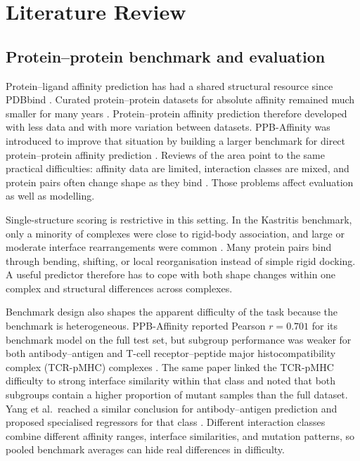 \chapter{Literature Review}
\label{ch:litreview}

\section{Protein--protein benchmark and evaluation}

Protein--ligand affinity prediction has had a shared structural resource since PDBbind \citep{Wang2004PDBbind}. Curated protein--protein datasets for absolute affinity remained much smaller for many years \citep{Kastritis2011Benchmark}. Protein--protein affinity prediction therefore developed with less data and with more variation between datasets. PPB-Affinity was introduced to improve that situation by building a larger benchmark for direct protein--protein affinity prediction \citep{Liu2024PPBAffinity}. Reviews of the area point to the same practical difficulties: affinity data are limited, interaction classes are mixed, and protein pairs often change shape as they bind \citep{Siebenmorgen2020PPIReview,Guo2022PPBAReview}. Those problems affect evaluation as well as modelling.

Single-structure scoring is restrictive in this setting. In the Kastritis benchmark, only a minority of complexes were close to rigid-body association, and large or moderate interface rearrangements were common \citep{Kastritis2011Benchmark}. Many protein pairs bind through bending, shifting, or local reorganisation instead of simple rigid docking. A useful predictor therefore has to cope with both shape changes within one complex and structural differences across complexes.

Benchmark design also shapes the apparent difficulty of the task because the benchmark is heterogeneous. PPB-Affinity reported Pearson $r=0.701$ for its benchmark model on the full test set, but subgroup performance was weaker for both antibody--antigen and T-cell receptor--peptide major histocompatibility complex (TCR-pMHC) complexes \citep{Liu2024PPBAffinity}. The same paper linked the TCR-pMHC difficulty to strong interface similarity within that class and noted that both subgroups contain a higher proportion of mutant samples than the full dataset. Yang et al.\ reached a similar conclusion for antibody--antigen prediction and proposed specialised regressors for that class \citep{Yang2023AntibodyAffinity}. Different interaction classes combine different affinity ranges, interface similarities, and mutation patterns, so pooled benchmark averages can hide real differences in difficulty.

